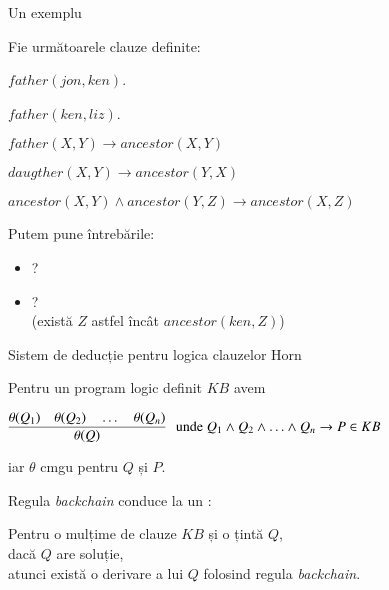 \documentclass[xcolor=pdftex,romanian,colorlinks]{beamer}
\begin{document}
\begin{frame}{Un exemplu}

Fie următoarele clauze definite:

\hspace{.4cm} $father(jon,ken)$.

\hspace{.4cm} $father(ken,liz)$.

\hspace{.4cm} $father(X,Y) \to ancestor(X,Y)$

\hspace{.4cm} $daugther(X,Y) \to ancestor(Y,X)$ 

\hspace{.4cm} $ancestor(X,Y) \wedge ancestor(Y,Z) \to ancestor(X,Z)$

\medskip
Putem pune întrebările:
\begin{itemize}
  \item {}?
  \item {}? \\(există $Z$ astfel încât $ancestor(ken,Z)$) 
\end{itemize}

\end{frame}

\begin{frame}{Sistem de deducție pentru logica clauzelor Horn}


Pentru un program logic definit $KB$  avem 

  \hfill \(\displaystyle
  \infer[\mbox{ unde }Q_1 \wedge Q_2 \wedge \ldots \wedge Q_n \to P \in KB]{\theta(Q)}{\theta(Q_1)\quad \theta(Q_2) \quad \ldots \quad \theta(Q_n)}
  \)\vspace{-2ex}

  \hfill iar $\theta$ cmgu pentru $Q$ și $P$.

\vspace{.4cm}
Regula \textit{backchain} conduce la un :
\begin{center}
  
  Pentru o mulțime de clauze $KB$ și o țintă $Q$, \\
  dacă $Q$ are soluție, \\
  atunci există o derivare a lui $Q$ folosind regula \textit{backchain}.
\end{center} 
\end{frame}
\end{document}
